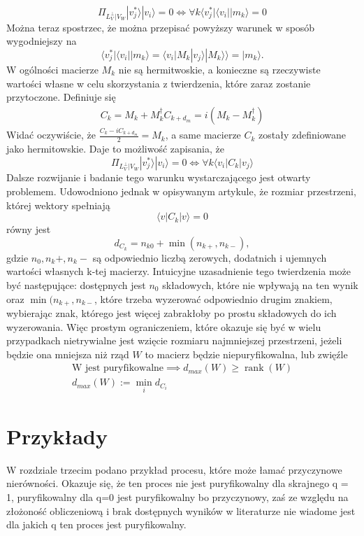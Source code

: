 \documentclass[10pt]{article} %
\DeclareMathOperator{\Rank}{rank}
\newcommand{\Ket}[1]{|#1\rangle}
\newcommand{\Bra}[1]{\langle#1|}
\newcommand{\KKet}[1]{|#1\rangle\rangle}
\newcommand{\LPV}{{L^\perp_V}}
\begin{document}
\begin{equation}
\Pi_{\LPV|V_W} \Ket{v^*_j}\Ket{v_i} = 0 \iff \forall k \Bra{v^*_j} \Bra{v_i} \Ket{m_k} = 0
\end{equation}
Można teraz spostrzec, że można przepisać powyższy warunek w sposób wygodniejszy na
\begin{equation}
\Bra{v^*_j} \Bra{v_i} \Ket{m_k} = \Bra{v_i} M_k \Ket{v_j}
\KKet{M_k} = \Ket{m_k}.
\end{equation}
W ogólności macierze $M_k$ nie są hermitwoskie, a konieczne są rzeczywiste wartości własne w celu skorzystania z twierdzenia, które zaraz zostanie przytoczone.
Definiuje się
\begin{gather}
C_k = M_k + M^\dag_k
C_{k+d_m} = i(M_k - M_k^\dag)
\end{gather}
Widać oczywiście, że $\frac{C_k-iC_{k+d_m}}{2} = M_k$, a same macierze $C_k$ zostały zdefiniowane jako hermitowskie. Daje to możliwość zapisania, że
\begin{equation}
\Pi_{\LPV|V_W} \Ket{v^*_j}\Ket{v_i} = 0 \iff \forall k \Bra{v_i} C_k \Ket{v_j}
\end{equation}
Dalsze rozwijanie i badanie tego warunku wystarczającego jest otwarty problemem. Udowodniono jednak w opisywanym artykule, że
rozmiar przestrzeni, której wektory spełniają
\begin{equation}
\Bra{v}C_k\Ket{v} = 0
\end{equation} równy jest 
\begin{equation}
d_{C_k} = n_{k0} + \min({n_{k+}, n_{k-}}),
\end{equation} gdzie $n_0, n_k+, n_k-$ są odpowiednio liczbą zerowych, dodatnich i ujemnych wartości własnych k-tej macierzy. Intuicyjne uzasadnienie tego twierdzenia może być następujące: dostępnych jest $n_0$ składowych, które nie wpływają na ten wynik oraz $\min({n_{k+}, n_{k-}}$, które trzeba wyzerować odpowiednio drugim znakiem, wybierając znak, którego jest więcej zabrakłoby po prostu składowych do ich wyzerowania.
Więc prostym ograniczeniem, które okazuje się być w wielu przypadkach nietrywialne jest wzięcie rozmiaru najmniejszej przestrzeni, jeżeli będzie ona mniejsza niż rząd $W$ to macierz będzie niepuryfikowalna, lub zwięźle
\begin{gather}
\text{W jest puryfikowalne} \implies d_{max}(W) \geq \Rank(W) \\
d_{max}(W) := \min_i d_{C_i} 
\end{gather}
\section{Przykłady}
W rozdziale trzecim podano przykład procesu, które może łamać przyczynowe nierówności. Okazuje się, że ten proces nie jest puryfikowalny dla skrajnego q = 1, puryfikowalny dla q=0 jest puryfikowalny bo przyczynowy, zaś ze względu na złożoność obliczeniową i brak dostępnych wyników w literaturze nie wiadome jest dla jakich q ten proces jest puryfikowalny.
\end{document}
